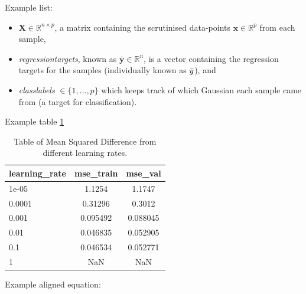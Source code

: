 Example list:

\begin{itemize}
    \item \(\bm{X} \in \mathbb{R}^{n \times p}\), a matrix containing the scrutinised data-points $\bm{x} \in \mathbb{R}^{p}$ from each sample,
    \item \textit{regression\textunderscore targets}, known as $\bm{\bar{y}}\in \mathbb{R}^n$, is a vector containing the regression targets for the samples (individually known as $\Bar{y}$), and
    \item \textit{class\textunderscore labels} $\in \{1,\dots,p\}$ which keeps track of which Gaussian each sample came from (a target for classification).
\end{itemize}

Example table \ref{table:1}

\begin{table}[!ht] %
    \begin{center}
    
        \begin{tabular}{|l|c|c|} 
            \hline
            \textbf{learning\_rate} & \textbf{mse\_train} & \textbf{mse\_val} \\ 
            \hline
            1e-05&1.1254&1.1747\\
            \hline
            0.0001&0.31296&0.3012\\
            \hline
            0.001&0.095492&0.088045\\
            \hline
            0.01&0.046835&0.052905 \\
            \hline
            0.1&0.046534&0.052771\\
            \hline
            1&NaN&NaN \\
            \hline
        \end{tabular}
        \caption{Table of Mean Squared Difference from different learning rates.}
        \label{table:1}
            
    \end{center}
\end{table}

Example aligned equation:

